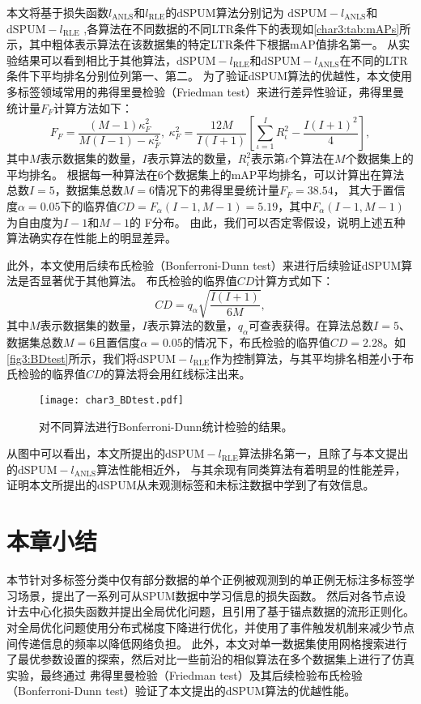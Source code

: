 本文将基于损失函数$l_{\mathrm{ANLS}}$和$l_{\mathrm{RLE}}$的dSPUM算法分别记为
$\mathrm{dSPUM}-l_{\mathrm{ANLS}}$和$\mathrm{dSPUM}-l_{\mathrm{RLE}}$
,各算法在不同数据的不同LTR条件下的表现如\autoref{char3:tab:mAPs}所示，其中粗体表示算法在该数据集的特定LTR条件下根据mAP值排名第一。
从实验结果可以看到相比于其他算法，$\mathrm{dSPUM}-l_{\mathrm{RLE}}$和$\mathrm{dSPUM}-l_{\mathrm{ANLS}}$在不同的LTR条件下平均排名分别位列第一、第二。
为了验证dSPUM算法的优越性，本文使用多标签领域常用的弗得里曼检验（Friedman test）来进行差异性验证，弗得里曼统计量$F_F$计算方法如下：
\begin{equation}
    \label{Friedman test}
    F_F = \frac{\left(M-1\right)\kappa_F^2 }{M\left(I-1\right)-\kappa_F^2},~
    \kappa_F^2=\frac{12M}{I\left(I+1\right)}\left[\sum_{\iota=1}^IR_\iota^2 - \frac{I\left(I+1\right)^2}{4}\right],
\end{equation}
其中$M$表示数据集的数量，$I$表示算法的数量，$R_\iota^2$表示第$\iota$个算法在$M$个数据集上的平均排名。
根据每一种算法在6个数据集上的mAP平均排名，可以计算出在算法总数$I=5$，数据集总数$M=6$情况下的弗得里曼统计量$F_F=38.54$，
其大于置信度$\alpha=0.05$下的临界值$CD=F_{\alpha}\left(I-1,M-1\right)=5.19$，其中$F_{\alpha}\left(I-1,M-1\right)$为自由度为$I-1$和$M-1$的
F分布。
由此，我们可以否定零假设，说明上述五种算法确实存在性能上的明显差异。

此外，本文使用后续布氏检验（Bonferroni-Dunn test）来进行后续验证dSPUM算法是否显著优于其他算法。
{布氏检验的临界值$CD$计算方式如下：
\begin{equation}
    \label{Bonferroni-Dunn test}
    CD = q_\alpha\sqrt{\frac{I\left(I+1\right)}{6M}},
\end{equation}
其中$M$表示数据集的数量，$I$表示算法的数量，$q_\alpha$可查表获得。在算法总数$I=5$、数据集总数$M=6$}且置信度$\alpha=0.05$的情况下，布氏检验的临界值$CD=2.28$。如\autoref{fig3:BDtest}所示，我们将$\mathrm{dSPUM}-l_{\mathrm{RLE}}$作为控制算法，与其{平均排名}相差小于布氏检验的临界值$CD$的算法将会用红线标注出来。
\begin{figure}
    \centering
    \texttt{[image: char3\_BDtest.pdf]}
    \caption{\label{fig3:BDtest}对不同算法进行Bonferroni-Dunn统计检验的结果。}
\end{figure}
从图中可以看出，本文所提出的$\mathrm{dSPUM}-l_{\mathrm{RLE}}$算法排名第一，且除了与本文提出的$\mathrm{dSPUM}-l_{\mathrm{ANLS}}$算法性能相近外，
与其余现有同类算法有着明显的性能差异，证明本文所提出的$\mathrm{dSPUM}$从未观测标签和未标注数据中学到了有效信息。

\section{本章小结}\label{Char3_Summary}
本节针对多标签分类中仅有部分数据的单个正例被观测到的单正例无标注多标签学习场景，提出了一系列可从SPUM数据中学习信息的损失函数。
然后对各节点设计去中心化损失函数并提出全局优化问题，且引用了基于锚点数据的流形正则化。
对全局优化问题使用分布式梯度下降进行优化，并使用了事件触发机制来减少节点间传递信息的频率以降低网络负担。
此外，本文对单一数据集使用网格搜索进行了最优参数设置的探索，然后对比一些前沿的相似算法在多个数据集上进行了仿真实验，最终通过
弗得里曼检验（Friedman test）及其后续检验布氏检验（Bonferroni-Dunn test）验证了本文提出的dSPUM算法的优越性能。

